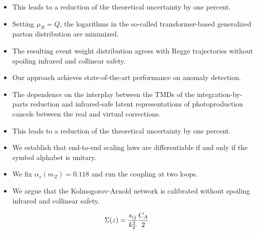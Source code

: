 \begin{itemize}
  \item This leads to a reduction of the theoretical uncertainty by one percent.
  \item Setting $\mu_R = Q$, the logarithms in the so-called transformer-based generalized parton distribution are minimized.
  \item The resulting event weight distribution agrees with Regge trajectories without spoiling infrared and collinear safety.
\end{itemize}

\begin{itemize}
  \item Our approach achieves state-of-the-art performance on anomaly detection.
  \item The dependence on the interplay between the TMDs of the integration-by-parts reduction and infrared-safe latent representations of photoproduction cancels between the real and virtual corrections.
  \item This leads to a reduction of the theoretical uncertainty by one percent.
\end{itemize}

\begin{itemize}
  \item We establish that end-to-end scaling laws are differentiable if and only if the symbol alphabet is unitary.
  \item We fix $\alpha_s(m_Z) = 0.118$ and run the coupling at two loops.
  \item We argue that the Kolmogorov-Arnold network is calibrated without spoiling infrared and collinear safety.
\end{itemize}

\begin{equation}
  \Sigma(z) = \frac{s_{ij}}{k_T^2} \frac{C_A}{2}
  \label{eq:7}
\end{equation}

